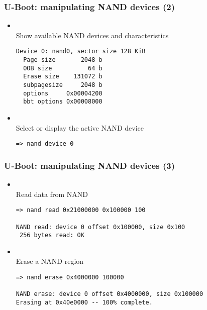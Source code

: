 \begin{frame}[fragile]
  \frametitle{U-Boot: manipulating NAND devices (2)}
  \begin{itemize}
  \item {}\\
    Show available NAND devices and characteristics
    \begin{block}{}
    \footnotesize
    \begin{verbatim}
Device 0: nand0, sector size 128 KiB
  Page size       2048 b
  OOB size          64 b
  Erase size    131072 b
  subpagesize     2048 b
  options     0x00004200
  bbt options 0x00008000
    \end{verbatim}
    \end{block}
  \item {}\\
    Select or display the active NAND device
    \begin{block}{}
    \footnotesize
    \begin{verbatim}
=> nand device 0
    \end{verbatim}
    \end{block}
  \end{itemize}
\end{frame}

\begin{frame}[fragile]
  \frametitle{U-Boot: manipulating NAND devices (3)}
  \begin{itemize}
  \item {}\\
    Read data from NAND
    \begin{block}{}
    \footnotesize
    \begin{verbatim}
=> nand read 0x21000000 0x100000 100

NAND read: device 0 offset 0x100000, size 0x100
 256 bytes read: OK
    \end{verbatim}
    \end{block}
  \item {}\\
    Erase a NAND region
    \begin{block}{}
    \footnotesize
    \begin{verbatim}
=> nand erase 0x4000000 100000

NAND erase: device 0 offset 0x4000000, size 0x100000
Erasing at 0x40e0000 -- 100% complete.
    \end{verbatim}
    \end{block}
  \end{itemize}
\end{frame}

